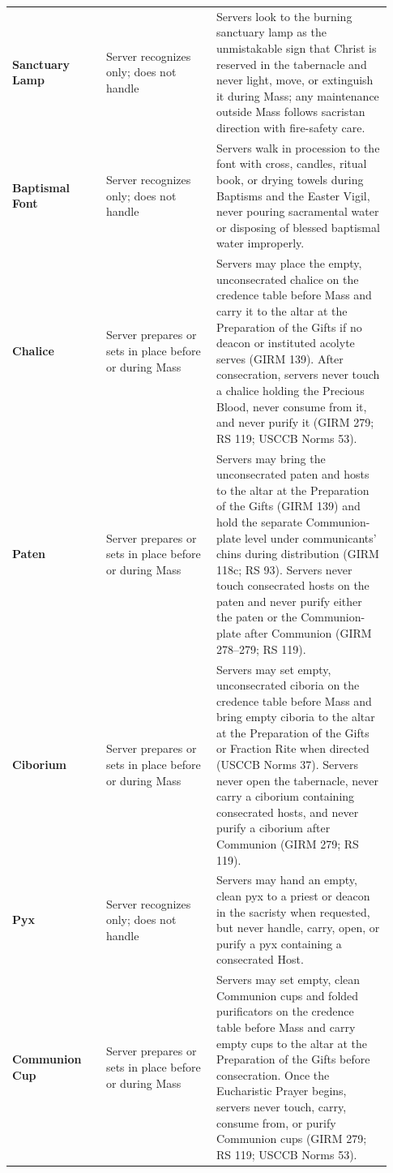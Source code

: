 {\begin{longtable}{>{\raggedright\arraybackslash}p{0.23\linewidth}>{\raggedright\arraybackslash}p{0.27\linewidth}>{\raggedright\arraybackslash}p{0.43\linewidth}}
\textbf{Sanctuary Lamp} & Server recognizes only; does not handle & Servers look to the burning sanctuary lamp as the unmistakable sign that Christ is reserved in the tabernacle and never light, move, or extinguish it during Mass; any maintenance outside Mass follows sacristan direction with fire-safety care. \\
\textbf{Baptismal Font} & Server recognizes only; does not handle & Servers walk in procession to the font with cross, candles, ritual book, or drying towels during Baptisms and the Easter Vigil, never pouring sacramental water or disposing of blessed baptismal water improperly. \\
\textbf{Chalice} & Server prepares or sets in place before or during Mass & Servers may place the empty, unconsecrated chalice on the credence table before Mass and carry it to the altar at the Preparation of the Gifts if no deacon or instituted acolyte serves (GIRM 139). After consecration, servers never touch a chalice holding the Precious Blood, never consume from it, and never purify it (GIRM 279; RS 119; USCCB Norms 53). \\
\textbf{Paten} & Server prepares or sets in place before or during Mass & Servers may bring the unconsecrated paten and hosts to the altar at the Preparation of the Gifts (GIRM 139) and hold the separate Communion-plate level under communicants' chins during distribution (GIRM 118c; RS 93). Servers never touch consecrated hosts on the paten and never purify either the paten or the Communion-plate after Communion (GIRM 278--279; RS 119). \\
\textbf{Ciborium} & Server prepares or sets in place before or during Mass & Servers may set empty, unconsecrated ciboria on the credence table before Mass and bring empty ciboria to the altar at the Preparation of the Gifts or Fraction Rite when directed (USCCB Norms 37). Servers never open the tabernacle, never carry a ciborium containing consecrated hosts, and never purify a ciborium after Communion (GIRM 279; RS 119). \\
\textbf{Pyx} & Server recognizes only; does not handle & Servers may hand an empty, clean pyx to a priest or deacon in the sacristy when requested, but never handle, carry, open, or purify a pyx containing a consecrated Host. \\
\textbf{Communion Cup} & Server prepares or sets in place before or during Mass & Servers may set empty, clean Communion cups and folded purificators on the credence table before Mass and carry empty cups to the altar at the Preparation of the Gifts before consecration. Once the Eucharistic Prayer begins, servers never touch, carry, consume from, or purify Communion cups (GIRM 279; RS 119; USCCB Norms 53). \\

\end{longtable}}
